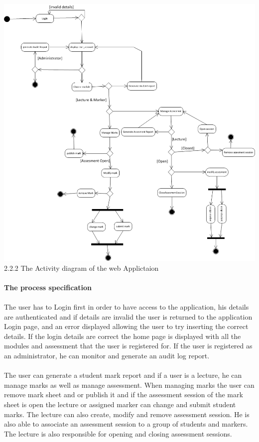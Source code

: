 \documentclass[12pt,a4paper]{article}
\begin{document}
\includegraphics[scale=0.60]{activity_diagram.png}
2.2.2 The Activity diagram of the web Applictaion\\\\
\textbf{The process specification}\\\\
The user has to Login first in order to have access to the application, his details are authenticated and if details are invalid the user is returned to the application Login page, and an error displayed allowing the user to try inserting the correct details. If the login details are correct the home page is displayed with all the modules and assessment that the user is registered for. If the user is registered as an administrator, he can monitor and generate an audit log report.\\\\
The user can generate a student mark report and if a user is a lecture, he can manage marks as well as manage assessment. When managing marks the user can remove mark sheet and or publish it and if the assessment session of the mark sheet is open the lecture or assigned marker can change and submit student marks. The lecture can also create, modify and remove assessment session. He is also able to associate an assessment session to a group of students and markers. The lecture is also responsible for opening and closing assessment sessions.
\end{document}
